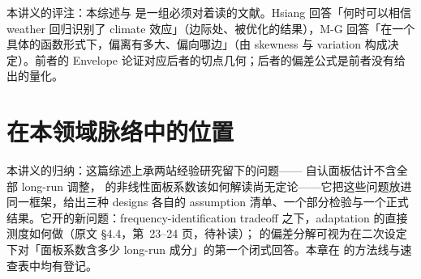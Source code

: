 本讲义的评注：本综述与  是一组必须对着读的文献。Hsiang 回答「何时可以相信 weather 回归识别了 climate 效应」（边际处、被优化的结果），M-G 回答「在一个具体的函数形式下，偏离有多大、偏向哪边」（由 skewness 与 variation 构成决定）。前者的 Envelope 论证对应后者的切点几何；后者的偏差公式是前者没有给出的量化。

\section{在本领域脉络中的位置}

本讲义的归纳：这篇综述上承两站经验研究留下的问题—— 自认面板估计不含全部 long-run 调整， 的非线性面板系数该如何解读尚无定论——它把这些问题放进同一框架，给出三种 designs 各自的 assumption 清单、一个部分检验与一个正式结果。它开的新问题：frequency-identification tradeoff 之下，adaptation 的直接测度如何做（原文 \S 4.4，第~23--24 页，待补读）； 的偏差分解可视为在二次设定下对「面板系数含多少 long-run 成分」的第一个闭式回答。本章在  的方法线与速查表中均有登记。

\chapterrefs
